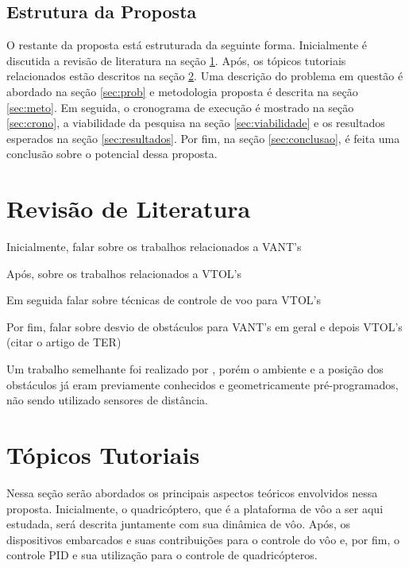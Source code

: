 \documentclass[a4paper, 12pt]{article}
\begin{document}
\subsection{Estrutura da Proposta}

O restante da proposta está estruturada da seguinte forma. Inicialmente é discutida a revisão de literatura na seção \ref{sec:rev}. Após, os tópicos tutoriais relacionados estão descritos na seção \ref{sec:tutoriais}. Uma descrição do problema em questão é abordado na seção \ref{sec:prob} e metodologia proposta é descrita na seção \ref{sec:meto}. Em seguida, o cronograma de execução é mostrado na seção \ref{sec:crono}, a viabilidade da pesquisa na seção \ref{sec:viabilidade} e os resultados esperados na seção \ref{sec:resultados}. Por fim, na seção \ref{sec:conclusao}, é feita uma conclusão sobre o potencial dessa proposta. 

\newpage

\section{Revisão de Literatura}
\label{sec:rev}

Inicialmente, falar sobre os trabalhos relacionados a VANT's

Após, sobre os trabalhos relacionados a VTOL's

Em seguida falar sobre técnicas de controle de voo para VTOL's

Por fim, falar sobre desvio de obstáculos para VANT's em geral e depois VTOL's (citar o artigo de TER)

Um trabalho semelhante foi realizado por \cite{Israelsen}, porém o ambiente e a posição dos obstáculos já eram previamente conhecidos e geometricamente pré-programados, não sendo utilizado sensores de distância. 

\newpage

\section{Tópicos Tutoriais}
\label{sec:tutoriais}

Nessa seção serão abordados os principais aspectos teóricos envolvidos nessa proposta. Inicialmente, 
o quadricóptero, que é a plataforma de vôo a ser aqui estudada, será descrita juntamente com sua dinâmica de vôo. Após, os dispositivos embarcados e suas contribuições para o controle do vôo e, por fim, o controle PID e sua utilização para o controle de quadricópteros.
\end{document}
